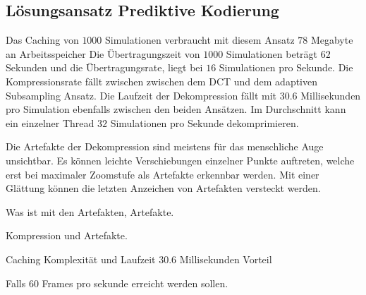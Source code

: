 \subsection{Lösungsansatz Prediktive Kodierung}
Das Caching von $1000$ Simulationen verbraucht mit diesem Ansatz $78$ Megabyte an Arbeitsspeicher Die Übertragungszeit von $1000$ Simulationen beträgt  $62$ Sekunden und die Übertragungsrate, liegt bei $16$ Simulationen pro Sekunde. Die Kompressionsrate fällt zwischen zwischen dem DCT und dem adaptiven Subsampling Ansatz. Die Laufzeit der Dekompression fällt mit $30.6$ Millisekunden pro Simulation ebenfalls zwischen den beiden Ansätzen. Im Durchschnitt kann ein einzelner Thread $32$ Simulationen pro Sekunde dekomprimieren.

Die Artefakte der Dekompression sind meistens für das menschliche Auge unsichtbar. Es können leichte Verschiebungen einzelner Punkte auftreten, welche erst bei maximaler Zoomstufe als Artefakte erkennbar werden. Mit einer Glättung können die letzten Anzeichen von Artefakten versteckt werden. 

Was ist mit den Artefakten, 
Artefakte.

Kompression und Artefakte. 

Caching
Komplexität und Laufzeit $30.6$ Millisekunden
Vorteil

Falls 60 Frames pro sekunde erreicht werden sollen.